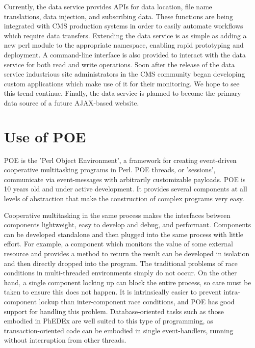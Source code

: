 \documentclass{PoS}
\begin{document}
Currently, the data service provides APIs for data location, file name
translations, data injection, and subscribing data.  These functions
are being integrated with CMS production systems in order to easily
automate workflows which require data transfers.  Extending the data
service is as simple as adding a new perl module to the appropriate
namespace, enabling rapid prototyping and deployment.  A command-line
interface is also provided to interact with the data service for both
read and write operations.  Soon after the release of the data service
industrious site administrators in the CMS community began developing
custom applications which make use of it for their monitoring.  We
hope to see this trend continue.  Finally, the data service is planned
to become the primary data source of a future AJAX-based website.

\section{Use of POE}

POE \cite{poe} is the 'Perl Object Environment', a framework for creating
event-driven cooperative multitasking programs in Perl. POE threads,
or 'sessions', communicate via event-messages with arbitrarily
customizable payloads. POE is 10 years old and under active
development. It provides several components at all levels of
abstraction that make the construction of complex programs very easy.

Cooperative multitasking in the same process makes the interfaces
between components lightweight, easy to develop and debug, and
performant. Components can be developed standalone and then plugged
into the same process with little effort. For example, a component
which monitors the value of some external resource and provides a
method to return the result can be developed in isolation and then
directly dropped into the program. The traditional problems of race
conditions in multi-threaded environments simply do not occur. On the
other hand, a single component locking up can block the entire
process, so care must be taken to ensure this does not happen. It is
intrinsically easier to prevent intra-component lockup than
inter-component race conditions, and POE has good support for handling
this problem.  Database-oriented tasks such as those embodied in
PhEDEx are well suited to this type of programming, as
transaction-oriented code can be embodied in single event-handlers,
running without interruption from other threads.
\end{document}
